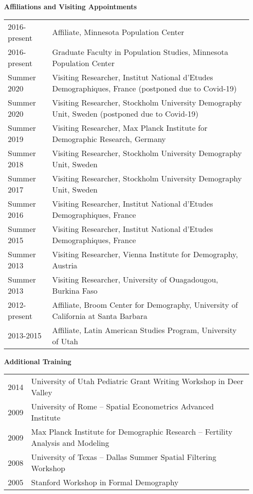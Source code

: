 \documentclass[11pt]{article} %
\begin{document}
\vspace{.5 cm}

\noindent
\textbf{Affiliations and Visiting Appointments}

\noindent
\begin{tabular}{lp{12cm}}
2016-present & Affiliate, Minnesota Population Center\\
2016-present& Graduate Faculty in Population Studies, Minnesota Population Center\\
Summer 2020 & Visiting Researcher, Institut National d'Etudes Demographiques, France (postponed due to Covid-19)\\
Summer 2020 & Visiting Researcher, Stockholm University Demography Unit, Sweden (postponed due to Covid-19)\\ 
Summer 2019 & Visiting Researcher, Max Planck Institute for Demographic Research, Germany\\
Summer 2018 & Visiting Researcher, Stockholm University Demography Unit, Sweden\\ 
Summer 2017 & Visiting Researcher, Stockholm University Demography Unit, Sweden\\ 
Summer 2016 & Visiting Researcher, Institut National d'Etudes Demographiques, France\\
Summer 2015 & Visiting Researcher, Institut National d'Etudes Demographiques, France\\
Summer 2013 & Visiting Researcher, Vienna Institute for Demography, Austria\\
Summer 2013 & Visiting Researcher, University of Ouagadougou, Burkina Faso\\
2012-present & Affiliate, Broom Center for Demography, University of California at Santa Barbara \\
2013-2015 & Affiliate, Latin American Studies Program, University of Utah\\
\end{tabular}

\vspace{.5 cm}

\bigskip
\noindent
\textbf{Additional Training}


\noindent
\begin{tabular}{lp{12cm}}
2014 & University of Utah Pediatric Grant Writing Workshop in Deer Valley \\
2009 & University of Rome -- Spatial Econometrics Advanced Institute \\
2009 & Max Planck Institute for Demographic Research -- Fertility Analysis and Modeling \\
2008 & University of Texas -- Dallas Summer Spatial Filtering Workshop \\
2005 & Stanford Workshop in Formal Demography \\
\end{tabular}
\end{document}
